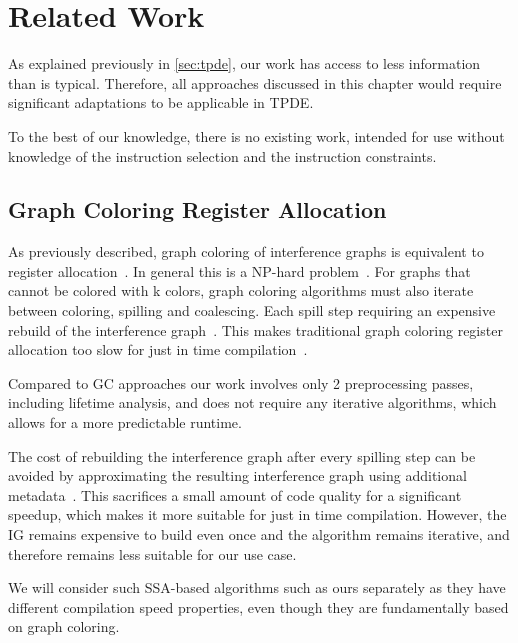 
\chapter{Related Work}\label{chapter:related_work}
 
As explained previously in \autoref{sec:tpde}, our work has access to less information than is typical. Therefore,  all approaches discussed in this chapter would require significant adaptations to be applicable in TPDE.

To the best of our knowledge, there is no existing work, intended for use without knowledge of the instruction selection and the instruction constraints.



\section{Graph Coloring Register Allocation}


As previously described, graph coloring of interference graphs is equivalent to register allocation~\autocite{chaitin1981}. 
In general this is a NP-hard problem~\autocite{chaitin1981}. For graphs that cannot be colored with k colors, graph coloring algorithms must also iterate between coloring, spilling and coalescing. Each spill step requiring an expensive rebuild of the interference graph~\autocite{Cooper06}. This makes traditional graph coloring register allocation too slow for just in time compilation~\autocite{Cooper06}. 

Compared to GC approaches our work involves only 2 preprocessing passes, including lifetime  analysis, and does not require any iterative algorithms, which allows for a more predictable runtime. 

The cost of rebuilding the interference graph after every spilling step can be avoided by approximating the resulting interference graph using additional metadata~\autocite{Cooper06}. This sacrifices a small amount of code quality for a significant speedup, which makes it more suitable for just in time compilation. However, the IG remains expensive to build even once and the algorithm remains iterative, and therefore remains less suitable for our use case.

We will consider such SSA-based algorithms such as ours separately as they have different compilation speed properties, even though they are fundamentally based on graph coloring.

